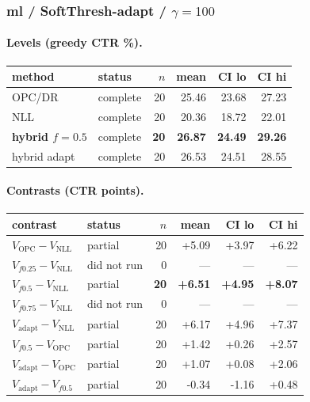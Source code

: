 \documentclass[10pt,a4paper]{article}
\begin{document}
\subsubsection{ml / SoftThresh-adapt / $\gamma=100$}
\paragraph{Levels (greedy CTR \%).}
{\centering\small\begin{tabular}{llrrrr}
\toprule method & status & $n$ & mean & CI lo & CI hi \\
\midrule
OPC/DR & complete & 20 & 25.46 & 23.68 & 27.23 \\
NLL & complete & 20 & 20.36 & 18.72 & 22.01 \\
\textbf{hybrid $f{=}0.5$} & complete & \textbf{20} & \textbf{26.87} & \textbf{24.49} & \textbf{29.26} \\
hybrid adapt & complete & 20 & 26.53 & 24.51 & 28.55 \\
\bottomrule\end{tabular}\par}
\paragraph{Contrasts (CTR points).}
{\centering\small\begin{tabular}{llrrrr}
\toprule contrast & status & $n$ & mean & CI lo & CI hi \\
\midrule
$V_{\mathrm{OPC}}-V_{\mathrm{NLL}}$ & partial & 20 & +5.09 & +3.97 & +6.22 \\
$V_{f0.25}-V_{\mathrm{NLL}}$ & did not run & 0 & --- & --- & --- \\
\textbf{$V_{f0.5}-V_{\mathrm{NLL}}$} & partial & \textbf{20} & \textbf{+6.51} & \textbf{+4.95} & \textbf{+8.07} \\
$V_{f0.75}-V_{\mathrm{NLL}}$ & did not run & 0 & --- & --- & --- \\
$V_{\mathrm{adapt}}-V_{\mathrm{NLL}}$ & partial & 20 & +6.17 & +4.96 & +7.37 \\
$V_{f0.5}-V_{\mathrm{OPC}}$ & partial & 20 & +1.42 & +0.26 & +2.57 \\
$V_{\mathrm{adapt}}-V_{\mathrm{OPC}}$ & partial & 20 & +1.07 & +0.08 & +2.06 \\
$V_{\mathrm{adapt}}-V_{f0.5}$ & partial & 20 & -0.34 & -1.16 & +0.48 \\
\bottomrule\end{tabular}\par}
\end{document}

